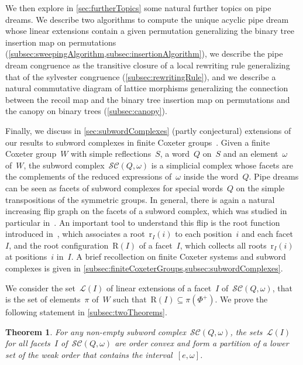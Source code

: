 \documentclass[reqno]{amsart}
\newtheorem{theoremA}{Theorem}
\theoremstyle{definition}
\newcommand{\linearExtensions}{\mathcal{L}} %
\newcommand{\subwordComplex}{\mathcal{SC}} %
\newcommand{\Roots}{\mathrm{R}} %
\newcommand{\rootFunction}[2]{\mathrm{r}_{#1}(#2)} %
\begin{document}
We then explore in \cref{sec:furtherTopics} some natural further topics on pipe dreams.
We describe two algorithms to compute the unique acyclic pipe dream whose linear extensions contain a given permutation generalizing the binary tree insertion map on permutations (\cref{subsec:sweepingAlgorithm,subsec:insertionAlgorithm}), we describe the pipe dream congruence as the transitive closure of a local rewriting rule generalizing that of the sylvester congruence (\cref{subsec:rewritingRule}), and we describe a natural commutative diagram of lattice morphisms generalizing the connection between the recoil map and the binary tree insertion map on permutations and the canopy on binary trees (\cref{subsec:canopy}).

Finally, we discuss in \cref{sec:subwordComplexes} (partly conjectural) extensions of our results to subword complexes in finite Coxeter groups~\cite{KnutsonMiller-subwordComplex}.
Given a finite Coxeter group~$W$ with simple reflections~$S$, a word~$Q$ on~$S$ and an element~$\omega$ of~$W$, the subword complex~$\subwordComplex(Q,\omega)$ is a simplicial complex whose facets are the complements of the reduced expressions of~$\omega$ inside the word~$Q$.
Pipe dreams can be seen as facets of subword complexes for special words~$Q$ on the simple transpositions of the symmetric groups.
In general, there is again a natural increasing flip graph on the facets of a subword complex, which was studied in particular in~\cite{PilaudStump-ELlabelings}.
An important tool to understand this flip is the root function introduced in~\cite{CeballosLabbeStump}, which associates a root~$\rootFunction{I}{i}$ to each position~$i$ and each facet~$I$, and the root configuration~$\Roots(I)$ of a facet~$I$, which collects all roots~$\rootFunction{I}{i}$ at positions~$i$ in~$I$.
A brief recollection on finite Coxeter systems and subword complexes is given in \cref{subsec:finiteCoxeterGroups,subsec:subwordComplexes}.

We consider the set~$\linearExtensions(I)$ of linear extensions of a facet~$I$ of~$\subwordComplex(Q,\omega)$, that is the set of elements~$\pi$ of~$W$ such that~${\Roots(I) \subseteq \pi(\Phi^+)}$.
We prove the following statement in \cref{subsec:twoTheorems}.

\begin{theoremA}
\label{thm:B}
For any non-empty subword complex~$\subwordComplex(Q, \omega)$, the sets~$\linearExtensions(I)$ for all facets~$I$ of~$\subwordComplex(Q, \omega)$ are order convex and form a partition of a lower set of the weak order that contains the interval~$[e, \omega]$.
\end{theoremA}
\end{document}
